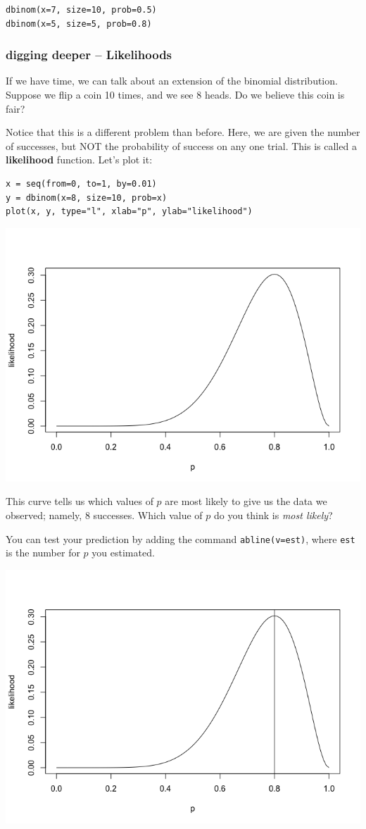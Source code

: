 \documentclass[11pt]{article}
\begin{document}
\begin{verbatim}
dbinom(x=7, size=10, prob=0.5)
dbinom(x=5, size=5, prob=0.8)
\end{verbatim}

\subsubsection*{digging deeper -- Likelihoods}
\label{sec-3-1-4}
If we have time, we can talk about an extension of the binomial distribution.  Suppose we flip a coin 10 times, and we see 8 heads.  Do we believe this coin is fair?

Notice that this is a different problem than before.  Here, we are given the number of successes, but NOT the probability of success on any one trial.  This is called a \textbf{likelihood} function.  Let's plot it:

\begin{verbatim}
x = seq(from=0, to=1, by=0.01)
y = dbinom(x=8, size=10, prob=x)
plot(x, y, type="l", xlab="p", ylab="likelihood")
\end{verbatim}

\includegraphics[width=.9\linewidth]{figures/week1/likelihood.png}

This curve tells us which values of $p$ are most likely to give us the data we observed; namely, 8 successes.  Which value of $p$ do you think is \emph{most likely}?

You can test your prediction by adding the command \texttt{abline(v=est)}, where \texttt{est} is the number for $p$ you estimated.

\includegraphics[width=.9\linewidth]{figures/week1/mle.png}
\end{document}
